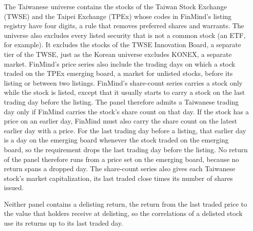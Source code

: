 \documentclass[a4paper,fleqn]{cas-sc}
\begin{document}
The Taiwanese universe contains the stocks of the Taiwan Stock Exchange (TWSE) and the Taipei Exchange (TPEx) whose codes in FinMind's listing registry have four digits, a rule that removes preferred shares and warrants. The universe also excludes every listed security that is not a common stock (an ETF, for example). It excludes the stocks of the TWSE Innovation Board, a separate tier of the TWSE, just as the Korean universe excludes KONEX, a separate market. FinMind's price series also include the trading days on which a stock traded on the TPEx emerging board, a market for unlisted stocks, before its listing or between two listings. FinMind's share-count series carries a stock only while the stock is listed, except that it usually starts to carry a stock on the last trading day before the listing. The panel therefore admits a Taiwanese trading day only if FinMind carries the stock's share count on that day. If the stock has a price on an earlier day, FinMind must also carry the share count on the latest earlier day with a price. For the last trading day before a listing, that earlier day is a day on the emerging board whenever the stock traded on the emerging board, so the requirement drops the last trading day before the listing. No return of the panel therefore runs from a price set on the emerging board, because no return spans a dropped day. The share-count series also gives each Taiwanese stock's market capitalization, its last traded close times its number of shares issued.

Neither panel contains a delisting return, the return from the last traded price to the value that holders receive at delisting, so the correlations of a delisted stock use its returns up to its last traded day.
\end{document}
